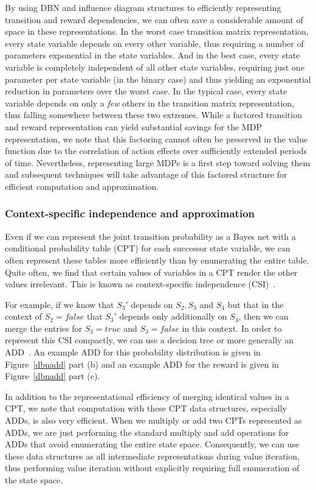 By using DBN and influence diagram structures to
efficiently representing transition and reward dependencies, we can
often save a considerable amount of space in these representations.
In the worst case transition matrix representation, every state
variable depends on every other variable, thus requiring a number of
parameters exponential in the state variables.  And in the best case,
every state variable is completely independent of all other state
variables, requiring just one parameter per state variable (in the
binary case) and thus yielding an exponential reduction in parameters over
the worst case.  In the typical case, every state variable
depends on only a \emph{few} others in the transition matrix
representation, thus falling somewhere between these two extremes.
While a factored transition and reward representation can yield
substantial savings for the MDP representation, we note that this factoring
cannot often be preserved in the value function due to the correlation
of action effects over sufficiently extended periods of time.
Nevertheless, representing large MDPs is a first step toward solving them
and subsequent techniques will take advantage of this factored structure
for efficient computation and approximation.

\subsubsection{Context-specific independence and approximation}

Even if we can represent the joint transition probability as a Bayes
net with a conditional probability table (CPT) for each successor
state variable, we can often represent these tables more efficiently
than by enumerating the entire table.  Quite often, we find that
certain values of variables in a CPT render the other values
irrelevant.  This is known as context-specific independence (CSI)~\cite{csi}.

For example, if we know that $S_3'$ depends on $S_2, S_3$ and $S_4$ but that in the context
of $S_2 = false$ that $S_3'$ depends only additionally on $S_4$, then we can merge
the entries for $S_3 = true$ and $S_3 = false$ in this context.  In order to represent
this CSI compactly, we can use a decision tree or more generally
an ADD~\cite{bryant:bdd86}.  An example ADD for this probability distribution is given 
in Figure~\ref{dbnadd} part (b) and an example ADD for the reward is given in
Figure~\ref{dbnadd} part (c).

In addition to the representational efficiency of merging identical
values in a CPT, we note that computation with these CPT data
structures, especially ADDs, is also very efficient.  When we multiply
or add two CPTs represented as ADDs, we are just performing the
standard multiply and add operations for ADDs that avoid enumerating
the entire state space.  Consequently, we can use these data
structures as all intermediate representations during value iteration,
thus performing value iteration without explicitly requiring full
enumeration of the state space.

